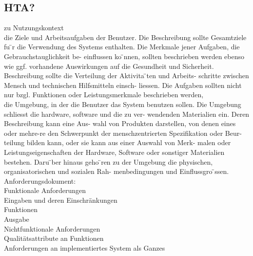 \subsection{HTA?}

zu Nutzungskontext\\
die Ziele und Arbeitsaufgaben der Benutzer. Die Beschreibung sollte Gesamtziele fu ̈r die Verwendung des Systems enthalten. Die Merkmale jener Aufgaben, die Gebrauchstauglichkeit be- einflussen ko ̈nnen, sollten beschrieben werden ebenso wie ggf. vorhandene Auswirkungen auf die Gesundheit und Sicherheit. Beschreibung sollte die Verteilung der Aktivita ̈ten und Arbeits- schritte zwischen Mensch und technischen Hilfsmitteln einsch- liessen. Die Aufgaben sollten nicht nur bzgl. Funktionen oder Leistungsmerkmale beschrieben werden,\\

die Umgebung, in der die Benutzer das System benutzen sollen. Die Umgebung schliesst die hardware, software und die zu ver- wendenden Materialien ein. Deren Beschreibung kann eine Aus- wahl von Produkten darstellen, von denen eines oder mehre-re den Schwerpunkt der menschzentrierten Spezifikation oder Beur- teilung bilden kann, oder sie kann aus einer Auswahl von Merk- malen oder Leistungseigenschaften der Hardware, Software oder sonstiger Materialien bestehen. Daru ̈ber hinaus geho ̈ren zu der Umgebung die physischen, organisatorischen und sozialen Rah- menbedingungen und Einflussgro ̈ssen.\\


Anforderungsdokument:\\
Funktionale Anforderungen\\
Eingaben und deren Einschränkungen\\
Funktionen\\
Ausgabe\\

Nichtfunktionale Anforderungen\\
Qualitätsattribute an Funktionen\\
Anforderungen an implementiertes System als Ganzes\\





